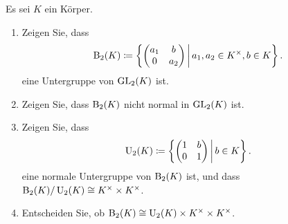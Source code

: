 \begin{question}
  Es sei $K$ ein Körper.
  \begin{enumerate}
    \item
      Zeigen Sie, dass
      \[
                  \operatorname{B}_2(K)
        \coloneqq \left\{
                    \begin{pmatrix}
                      a_1 & b   \\
                      0   & a_2
                    \end{pmatrix}
                  \,\middle|\,
                    a_1, a_2 \in K^\times,
                    b \in K
                  \right\}.
      \]
      eine Untergruppe von $\operatorname{GL}_2(K)$ ist.
    \item
      Zeigen Sie, dass $\operatorname{B}_2(K)$ nicht normal in $\operatorname{GL}_2(K)$ ist.
    \item
      Zeigen Sie, dass
      \[
                  \operatorname{U}_2(K)
        \coloneqq \left\{
                    \begin{pmatrix}
                      1 & b \\
                      0 & 1
                    \end{pmatrix}
                  \,\middle|\,
                    b \in K
                  \right\}.
      \]
      eine normale Untergruppe von $\operatorname{B}_2(K)$ ist, und dass $\operatorname{B}_2(K)/\operatorname{U}_2(K) \cong K^\times \times K^\times$.
    \item
      Entscheiden Sie, ob $\operatorname{B}_2(K) \cong \operatorname{U}_2(K) \times K^\times \times K^\times$.
  \end{enumerate}
\end{question}



